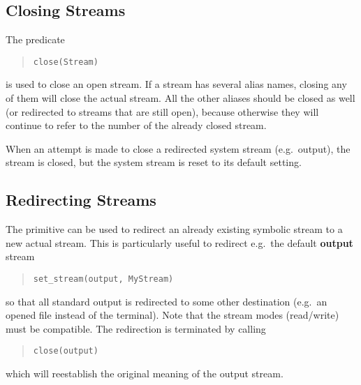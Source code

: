 \subsection{Closing Streams}

The predicate
\begin{quote}\begin{verbatim}
close(Stream)
\end{verbatim}\end{quote}
is used to close an open stream.
If a stream has several alias names, closing any of them will close
the actual stream. All the other aliases should be closed as well
(or redirected to streams that are still open),
because otherwise they will continue
to refer to the number of the already closed stream.

When an attempt is made to close a redirected system stream (e.g.\ output),
the stream is closed, but the system stream is reset to its default setting.

\subsection{Redirecting Streams}

The 
primitive can be used to redirect an already existing symbolic stream
to a new actual stream.
This is particularly useful to redirect e.g.\ the default {\bf output} stream
\begin{quote}\begin{verbatim}
set_stream(output, MyStream)
\end{verbatim}\end{quote}
so that all standard output is redirected to some other destination
(e.g.\ an opened file instead of the terminal).
Note that the stream modes (read/write) must be compatible.
The redirection is terminated by calling
\begin{quote}\begin{verbatim}
close(output)
\end{verbatim}\end{quote}
which will reestablish the original meaning of the output stream.


